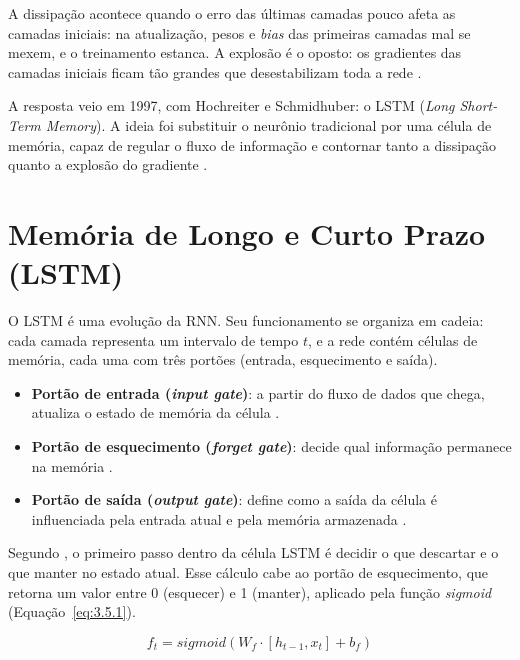 A dissipação acontece quando o erro das últimas camadas pouco afeta as camadas iniciais: na atualização, pesos e \textit{bias} das primeiras camadas mal se mexem, e o treinamento estanca. A explosão é o oposto: os gradientes das camadas iniciais ficam tão grandes que desestabilizam toda a rede \cite{goodfellow2016}.

A resposta veio em 1997, com Hochreiter e Schmidhuber: o LSTM (\textit{Long Short-Term Memory}). A ideia foi substituir o neurônio tradicional por uma célula de memória, capaz de regular o fluxo de informação e contornar tanto a dissipação quanto a explosão do gradiente \cite{hochreiter1997}.

\section{Memória de Longo e Curto Prazo (LSTM)}

O LSTM é uma evolução da RNN. Seu funcionamento se organiza em cadeia: cada camada representa um intervalo de tempo $t$, e a rede contém células de memória, cada uma com três portões (entrada, esquecimento e saída).

\begin{itemize}
    \item \textbf{Portão de entrada (\textit{input gate})}: a partir do fluxo de dados que chega, atualiza o estado de memória da célula \cite{hochreiter1997}.

    \item \textbf{Portão de esquecimento (\textit{forget gate})}: decide qual informação permanece na memória \cite{hochreiter1997}.

    \item \textbf{Portão de saída (\textit{output gate})}: define como a saída da célula é influenciada pela entrada atual e pela memória armazenada \cite{hochreiter1997}.
\end{itemize}

Segundo , o primeiro passo dentro da célula LSTM é decidir o que descartar e o que manter no estado atual. Esse cálculo cabe ao portão de esquecimento, que retorna um valor entre 0 (esquecer) e 1 (manter), aplicado pela função \textit{sigmoid} (Equação~\ref{eq:3.5.1}).

\begin{equation}
    f_{t} = sigmoid(W_{f} \cdot [h_{t-1}, x_{t}] + b_{f})
    \label{eq:3.5.1}
\end{equation}
 
